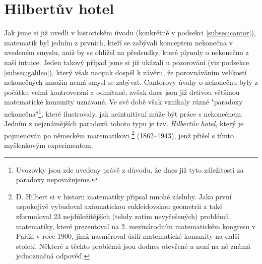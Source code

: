 \section{Hilbertův hotel}\label{sec:hilbertuv_hotel}
Jak jsme si již uvedli v historickém úvodu (konkrétně v podsekci \ref{subsec:cantor}), matematik  byl jedním z prvních, kteří se zabývali konceptem nekonečna v uvedeném smyslu, aniž by se ohlížel na předsudky, které plynuly o nekonečnu z naší intuice. Jeden takový případ jsme si již ukázali u pozorování  (viz podsekce \ref{subsec:galileo}), který však naopak dospěl k závěru, že porovnáváním velikostí nekonečných množin nemá smysl se zabývat. Cantorovy úvahy o nekonečnu byly z počátku velmi kontroverzní a odmítané, avšak dnes jsou již drtivou většinou matematické komunity uznávané. Ve své době však vznikaly různé "paradoxy nekonečna"\footnote{Uvozovky jsou zde uvedeny právě z důvodu, že dnes již tyto záležitosti za paradoxy nepovažujeme.}, které ilustrovaly, jak neintuitivní může být práce s nekonečnem. Jedním z nejznámějších paradoxů tohoto typu je tzv. \emph{Hilbertův hotel}, který je pojmenován po německém matematikovi \footnote{D. Hilbert si v historii matematiky připsal mnohé zásluhy. Jako první uspokojivě vybudoval axiomatickou eukleidovskou geometrii a také zformuloval 23 nejdůležitějších (tehdy zatím nevyřešených) problémů matematiky, které prezentoval na 2. mezinárodním matematickém kongresu v Paříži v roce 1900, jímž nasměroval úsilí matematické komunity na další století. Některé z těchto problémů jsou dodnes otevřené a není na ně známá jednoznačná odpověď.} (1862--1943), jenž přišel s tímto myšlenkovým experimentem.
\medskip

